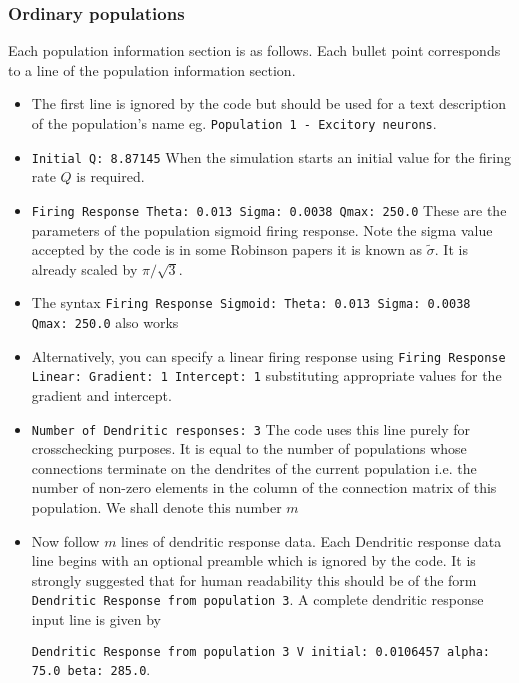 \documentclass[12pt,a4paper]{article}
\begin{document}
\subsubsection{Ordinary populations}
Each population information section is as follows. Each bullet point
corresponds to a line of the population information section.
\begin{itemize}
\item The first line is ignored by the code but should be used for
a text description of the population's name eg. 
{\tt \small Population 1 - Excitory neurons}.
\item {\tt \small Initial Q: 8.87145} When the simulation starts an initial
value for the firing rate $Q$ is required.
\item {\tt \small Firing Response Theta: 0.013 Sigma: 0.0038 Qmax: 250.0} These
are the parameters of the population sigmoid firing response. Note the
sigma value accepted by the code is in some Robinson papers it is known as $\tilde{\sigma}$.
It is already scaled  by $\pi / \sqrt{3}$.
\item The syntax {\tt \small Firing Response Sigmoid: Theta: 0.013 Sigma: 0.0038 Qmax: 250.0} also works
\item Alternatively, you can specify a linear firing response using {\tt \small Firing Response Linear: Gradient: 1 Intercept: 1} substituting appropriate values for the gradient and intercept. 
\item {\tt \small Number of Dendritic responses: 3} The code uses this line
purely for crosschecking purposes. It is equal to the number of
populations whose connections terminate on the dendrites of the current
population i.e. the number of non-zero elements in the column 
of the connection matrix of this population. We shall denote this number 
$m$
\item Now follow $m$ lines of dendritic response data. Each Dendritic
response data line begins with an optional preamble which is ignored 
by the code. It is strongly suggested that for human readability this
should be of the form {\tt \small Dendritic Response from population 3}. A complete
dendritic response input line is given by

{\tt \small Dendritic Response from population 3 V initial: 0.0106457 alpha: 75.0 beta: 285.0}.


\end{itemize}
\end{document}
